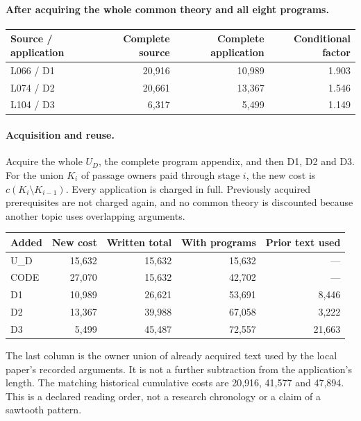 \documentclass[a4paper,11pt]{article}
\begin{document}
\paragraph{After acquiring the whole common theory and all eight programs.}
\begin{center}\begin{tabular}{lrrr}\toprule
Source / application & Complete source & Complete application & Conditional factor\\\midrule
L066 / D1 & 20,916 & 10,989 & 1.903\\
L074 / D2 & 20,661 & 13,367 & 1.546\\
L104 / D3 & 6,317 & 5,499 & 1.149\\
\bottomrule\end{tabular}\end{center}
\newpage
\paragraph{Acquisition and reuse.}
Acquire the whole $U_D$, the complete program appendix, and then D1, D2 and D3.
For the union $K_i$ of passage owners paid through stage $i$, the new cost is
$c(K_i\setminus K_{i-1})$. Every application is charged in full. Previously
acquired prerequisites are not charged again, and no common theory is discounted
because another topic uses overlapping arguments.
\begin{center}\begin{tabular}{lrrrr}\toprule
Added & New cost & Written total & With programs & Prior text used\\\midrule
U\_D & 15,632 & 15,632 & 15,632 & ---\\
CODE & 27,070 & 15,632 & 42,702 & ---\\
D1 & 10,989 & 26,621 & 53,691 & 8,446\\
D2 & 13,367 & 39,988 & 67,058 & 3,222\\
D3 & 5,499 & 45,487 & 72,557 & 21,663\\
\bottomrule\end{tabular}\end{center}
The last column is the owner union of already acquired text used by the local
paper's recorded arguments. It is not a further subtraction from the application's
length. The matching historical cumulative costs are 20,916, 41,577 and 47,894.
This is a declared reading order, not a research chronology or a claim of a
sawtooth pattern.
\end{document}
